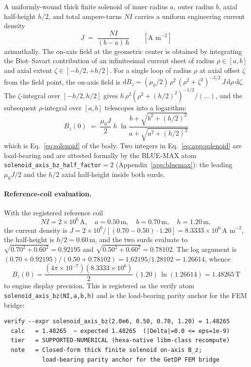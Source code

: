 A uniformly-wound thick finite solenoid of inner radius $a$, outer radius $b$,
axial half-height $h/2$, and total ampere-turns $NI$ carries a uniform
engineering current density
\begin{equation}
J \;=\; \frac{NI}{(b-a)\,h}\qquad[\text{A m}^{-2}]
\label{eq:app:J}
\end{equation}
azimuthally. The on-axis field at the geometric center is obtained by
integrating the Biot--Savart contribution of an infinitesimal current sheet
of radius $\rho\in[a,b]$ and axial extent $\zeta\in[-h/2,+h/2]$. For a single
loop of radius $\rho$ at axial offset $\zeta$ from the field point, the
on-axis field is $\mathrm{d}B_z = (\mu_0/2)\,\rho^{2}\,(\rho^{2}+\zeta^{2})^{-3/2}\,
J\,\mathrm{d}\rho\,\mathrm{d}\zeta$. The $\zeta$-integral over $[-h/2,h/2]$
gives $h\,\rho^{2}(\rho^{2}+(h/2)^{2})^{-1/2}/(\dots)$, and the subsequent
$\rho$-integral over $[a,b]$ telescopes into a logarithm:
\begin{equation}
\boxed{\;
B_z(0) \;=\; \frac{\mu_0 J}{2}\;h\;
  \ln\!\frac{b + \sqrt{b^{2} + (h/2)^{2}}}{a + \sqrt{a^{2} + (h/2)^{2}}}\;}
\label{eq:app:solenoid}
\end{equation}
which is Eq.~\eqref{eq:solenoid} of the body. Two integers in
Eq.~\eqref{eq:app:solenoid} are load-bearing and are attested formally by the
BLUE-MAX atom \texttt{solenoid\_axis\_bz\_half\_factor}$=2$
(Appendix~\ref{app:bluemax}): the leading $\mu_0 J/2$ and the $h/2$ axial
half-height inside both surds.

\paragraph{Reference-coil evaluation.}
With the registered reference coil
\begin{equation}
NI = 2\times10^{6}\,\text{A},\quad
a = 0.50\,\text{m},\quad
b = 0.70\,\text{m},\quad
h = 1.20\,\text{m},
\label{eq:app:refcoil}
\end{equation}
the current density is $J = 2\times10^{6}/[(0.70-0.50)\cdot1.20] =
8.3333\times10^{6}\,\text{A m}^{-2}$, the half-height is $h/2 = 0.60$\,m, and the
two surds evaluate to $\sqrt{0.70^{2}+0.60^{2}} = 0.92195$ and
$\sqrt{0.50^{2}+0.60^{2}} = 0.78102$. The log argument is
$(0.70+0.92195)/(0.50+0.78102) = 1.62195/1.28102 = 1.26614$, whence
\begin{equation}
B_z(0) = \frac{(4\pi\times10^{-7})(8.3333\times10^{6})}{2}\,(1.20)\,
         \ln(1.26614) = 1.48265\,\text{T}
\label{eq:app:refeval}
\end{equation}
to engine display precision. This is registered as the verify atom
\texttt{solenoid\_axis\_bz(NI,a,b,h)} and is the load-bearing parity anchor
for the FEM bridge:
\begin{lstlisting}
verify --expr solenoid_axis_bz(2.0e6, 0.50, 0.70, 1.20) = 1.48265
  calc   = 1.48265  ~ expected 1.48265  (|Delta|=0.0 <= eps=1e-9)
  tier   = SUPPORTED-NUMERICAL (hexa-native libm-class recompute)
  note   = Closed-form thick finite solenoid on-axis B_z;
           load-bearing parity anchor for the GetDP FEM bridge
\end{lstlisting}

